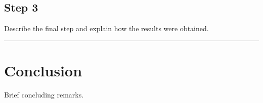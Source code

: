 \documentclass[11pt]{article}
\begin{document}
\subsection*{Step 3}
Describe the final step and explain how the results were obtained.

\vspace{1em}
\hrule
\vspace{1em}


\section*{Conclusion}

Brief concluding remarks.
\end{document}
